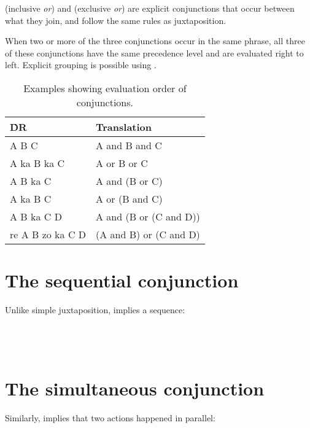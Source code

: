 \documentclass{book}
\begin{document}
 (inclusive \emph{or}) and  (exclusive \emph{or}) are explicit conjunctions that occur between what they join, and follow the same rules as juxtaposition.

When two or more of the three conjunctions occur in the same phrase, all three of these conjunctions have the same precedence level and are evaluated right to left. Explicit grouping is possible using .

\begin{table}[ht]
    \caption{Examples showing evaluation order of conjunctions.}
    \centering
    \begin{tabular}{|l|l|}
        \hline
        ḊR & Translation \\
        \hline
        A B C & A and B and C \\
        A ka B ka C & A or B or C \\
        A B ka C & A and (B or C) \\
        A ka B C & A or (B and C) \\
        A B ka C D & A and (B or (C and D)) \\
        re A B zo ka C D & (A and B) or (C and D) \\
        \hline
    \end{tabular}
\end{table}

\section{The sequential conjunction }

Unlike simple juxtaposition,  implies a sequence: \\
~\\
    \\
    \\
\emph{   }

\section{The simultaneous conjunction }

Similarly,  implies that two actions happened in parallel: \\
~\\
    \\
    \\
\emph{   }
\end{document}
